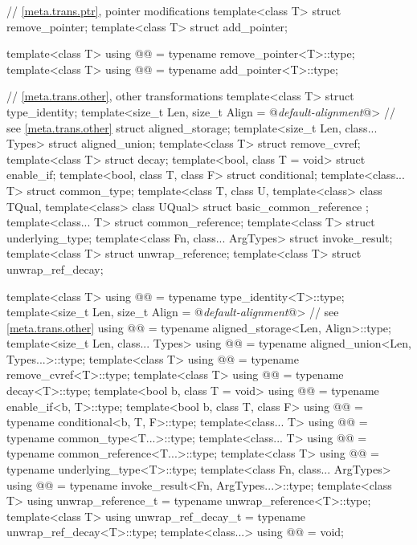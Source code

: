 \begin{codeblock}
{  // \ref{meta.trans.ptr}, pointer modifications
  template<class T> struct remove_pointer;
  template<class T> struct add_pointer;

  template<class T>
    using @@ = typename remove_pointer<T>::type;
  template<class T>
    using @@    = typename add_pointer<T>::type;

  // \ref{meta.trans.other}, other transformations
  template<class T> struct type_identity;
  template<size_t Len, size_t Align = @\textit{default-alignment}@> // see \ref{meta.trans.other}
    struct aligned_storage;
  template<size_t Len, class... Types> struct aligned_union;
  template<class T> struct remove_cvref;
  template<class T> struct decay;
  template<bool, class T = void> struct enable_if;
  template<bool, class T, class F> struct conditional;
  template<class... T> struct common_type;
  template<class T, class U, template<class> class TQual, template<class> class UQual>
    struct basic_common_reference { };
  template<class... T> struct common_reference;
  template<class T> struct underlying_type;
  template<class Fn, class... ArgTypes> struct invoke_result;
  template<class T> struct unwrap_reference;
  template<class T> struct unwrap_ref_decay;

  template<class T>
    using @@    = typename type_identity<T>::type;
  template<size_t Len, size_t Align = @\textit{default-alignment}@> // see \ref{meta.trans.other}
    using @@  = typename aligned_storage<Len, Align>::type;
  template<size_t Len, class... Types>
    using @@    = typename aligned_union<Len, Types...>::type;
  template<class T>
    using @@     = typename remove_cvref<T>::type;
  template<class T>
    using @@            = typename decay<T>::type;
  template<bool b, class T = void>
    using @@        = typename enable_if<b, T>::type;
  template<bool b, class T, class F>
    using @@      = typename conditional<b, T, F>::type;
  template<class... T>
    using @@      = typename common_type<T...>::type;
  template<class... T>
    using @@ = typename common_reference<T...>::type;
  template<class T>
    using @@  = typename underlying_type<T>::type;
  template<class Fn, class... ArgTypes>
    using @@    = typename invoke_result<Fn, ArgTypes...>::type;
  template<class T>
    using unwrap_reference_t = typename unwrap_reference<T>::type;
  template<class T>
    using unwrap_ref_decay_t = typename unwrap_ref_decay<T>::type;
  template<class...>
    using @@             = void;

}
\end{codeblock}
